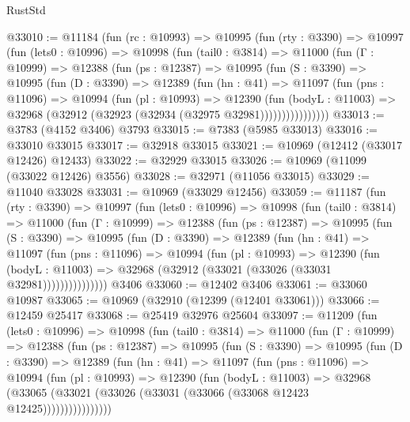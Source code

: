 \begin{lexlean}{RustStd}
\begin{coremodule}
@33010 := @11184
    (fun (rc : @10993) =>
    @10995
      (fun (rty : @3390) =>
      @10997
        (fun (lets0 : @10996) =>
        @10998
          (fun (tail0 : @3814) =>
          @11000
            (fun (Γ : @10999) =>
            @12388
              (fun (ps : @12387) =>
              @10995
                (fun (S : @3390) =>
                @10995
                  (fun (D : @3390) =>
                  @12389
                    (fun (hn : @41) =>
                    @11097
                      (fun (pns : @11096) =>
                      @10994
                        (fun (pl : @10993) =>
                        @12390
                          (fun (bodyL : @11003) =>
                          @32968 (@32912 (@32923 (@32934 (@32975 @32981))))))))))))))))
@33013 := @3783 (@4152 @3406) @3793
@33015 := @7383 (@5985 @33013)
@33016 := @33010 @33015
@33017 := @32918 @33015
@33021 := @10969 (@12412 (@33017 @12426) @12433)
@33022 := @32929 @33015
@33026 := @10969 (@11099 (@33022 @12426) @3556)
@33028 := @32971 (@11056 @33015)
@33029 := @11040 @33028
@33031 := @10969 (@33029 @12456)
@33059 := @11187
    (fun (rty : @3390) =>
    @10997
      (fun (lets0 : @10996) =>
      @10998
        (fun (tail0 : @3814) =>
        @11000
          (fun (Γ : @10999) =>
          @12388
            (fun (ps : @12387) =>
            @10995
              (fun (S : @3390) =>
              @10995
                (fun (D : @3390) =>
                @12389
                  (fun (hn : @41) =>
                  @11097
                    (fun (pns : @11096) =>
                    @10994
                      (fun (pl : @10993) =>
                      @12390
                        (fun (bodyL : @11003) =>
                        @32968 (@32912 (@33021 (@33026 (@33031 @32981)))))))))))))))
    @3406
@33060 := @12402 @3406
@33061 := @33060 @10987
@33065 := @10969 (@32910 (@12399 (@12401 @33061)))
@33066 := @12459 @25417
@33068 := @25419 @32976 @25604
@33097 := @11209
    (fun (lets0 : @10996) =>
    @10998
      (fun (tail0 : @3814) =>
      @11000
        (fun (Γ : @10999) =>
        @12388
          (fun (ps : @12387) =>
          @10995
            (fun (S : @3390) =>
            @10995
              (fun (D : @3390) =>
              @12389
                (fun (hn : @41) =>
                @11097
                  (fun (pns : @11096) =>
                  @10994
                    (fun (pl : @10993) =>
                    @12390
                      (fun (bodyL : @11003) =>
                      @32968
                        (@33065
                          (@33021 (@33026 (@33031 (@33066 (@33068 @12423 @12425))))))))))))))))

\end{coremodule}
\end{lexlean}
